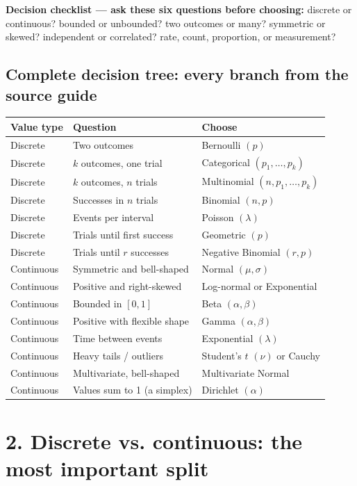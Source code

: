 \documentclass[11pt]{article}
\begin{document}
\textbf{Decision checklist — ask these six questions before choosing:} discrete or continuous? bounded or unbounded? two outcomes or many? symmetric or skewed? independent or correlated? rate, count, proportion, or measurement?

\subsection*{Complete decision tree: every branch from the source guide}
\small
\renewcommand{\arraystretch}{1.2}
\begin{tabularx}{\textwidth}{>{\raggedright\arraybackslash}p{} >{\raggedright\arraybackslash}p{} X}
\toprule
\textbf{Value type} & \textbf{Question} & \textbf{Choose} \\
\midrule
Discrete & Two outcomes & Bernoulli $(p)$ \\
Discrete & $k$ outcomes, one trial & Categorical $(p_1,\ldots,p_k)$ \\
Discrete & $k$ outcomes, $n$ trials & Multinomial $(n,p_1,\ldots,p_k)$ \\
Discrete & Successes in $n$ trials & Binomial $(n,p)$ \\
Discrete & Events per interval & Poisson $(\lambda)$ \\
Discrete & Trials until first success & Geometric $(p)$ \\
Discrete & Trials until $r$ successes & Negative Binomial $(r,p)$ \\
Continuous & Symmetric and bell-shaped & Normal $(\mu,\sigma)$ \\
Continuous & Positive and right-skewed & Log-normal or Exponential \\
Continuous & Bounded in $[0,1]$ & Beta $(\alpha,\beta)$ \\
Continuous & Positive with flexible shape & Gamma $(\alpha,\beta)$ \\
Continuous & Time between events & Exponential $(\lambda)$ \\
Continuous & Heavy tails / outliers & Student's $t$ $(\nu)$ or Cauchy \\
Continuous & Multivariate, bell-shaped & Multivariate Normal \\
Continuous & Values sum to 1 (a simplex) & Dirichlet $(\alpha)$ \\
\bottomrule
\end{tabularx}
\normalsize

\section*{2. Discrete vs. continuous: the most important split}
\end{document}
